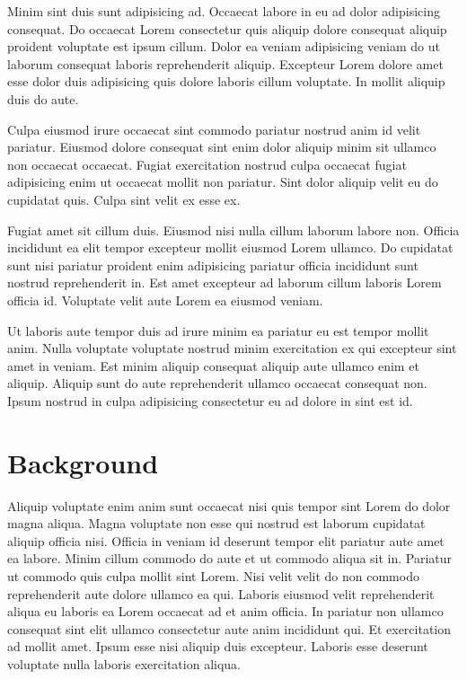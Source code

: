 Minim sint duis sunt adipisicing ad. Occaecat labore in eu ad dolor adipisicing consequat. Do occaecat Lorem consectetur quis aliquip dolore consequat aliquip proident voluptate est ipsum cillum. Dolor ea veniam adipisicing veniam do ut laborum consequat laboris reprehenderit aliquip. Excepteur Lorem dolore amet esse dolor duis adipisicing quis dolore laboris cillum voluptate. In mollit aliquip duis do aute.

Culpa eiusmod irure occaecat sint commodo pariatur nostrud anim id velit pariatur. Eiusmod dolore consequat sint enim dolor aliquip minim sit ullamco non occaecat occaecat. Fugiat exercitation nostrud culpa occaecat fugiat adipisicing enim ut occaecat mollit non pariatur. Sint dolor aliquip velit eu do cupidatat quis. Culpa sint velit ex esse ex.

Fugiat amet sit cillum duis. Eiusmod nisi nulla cillum laborum labore non. Officia incididunt ea elit tempor excepteur mollit eiusmod Lorem ullamco. Do cupidatat sunt nisi pariatur proident enim adipisicing pariatur officia incididunt sunt nostrud reprehenderit in. Est amet excepteur ad laborum cillum laboris Lorem officia id. Voluptate velit aute Lorem ea eiusmod veniam.

Ut laboris aute tempor duis ad irure minim ea pariatur eu est tempor mollit anim. Nulla voluptate voluptate nostrud minim exercitation ex qui excepteur sint amet in veniam. Est minim aliquip consequat aliquip aute ullamco enim et aliquip. Aliquip sunt do aute reprehenderit ullamco occaecat consequat non. Ipsum nostrud in culpa adipisicing consectetur eu ad dolore in sint est id.

\section{Background}
Aliquip voluptate enim anim sunt occaecat nisi quis tempor sint Lorem do dolor magna aliqua. Magna voluptate non esse qui nostrud est laborum cupidatat aliquip officia nisi. Officia in veniam id deserunt tempor elit pariatur aute amet ea labore. Minim cillum commodo do aute et ut commodo aliqua sit in. Pariatur ut commodo quis culpa mollit sint Lorem. Nisi velit velit do non commodo reprehenderit aute dolore ullamco ea qui.
Laboris eiusmod velit reprehenderit aliqua eu laboris ea Lorem occaecat ad et anim officia. In pariatur non ullamco consequat sint elit ullamco consectetur aute anim incididunt qui. Et exercitation ad mollit amet. Ipsum esse nisi aliquip duis excepteur. Laboris esse deserunt voluptate nulla laboris exercitation aliqua.




